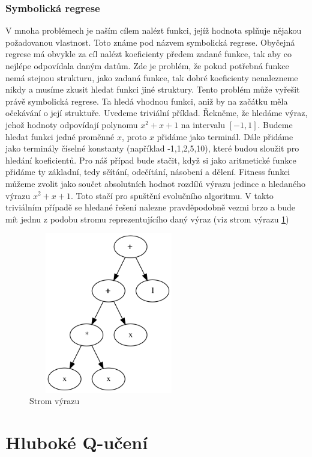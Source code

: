 \subsubsection{Symbolická regrese}
V mnoha problémech je naším cílem nalézt funkci, jejíž hodnota splňuje nějakou požadovanou vlastnost. Toto známe pod názvem symbolická regrese.
Obyčejná regrese má obvykle za cíl nalézt koeficienty předem zadané funkce, tak aby co nejlépe odpovídala daným datům.
Zde je problém, že pokud potřebná funkce nemá stejnou strukturu, jako zadaná funkce, tak dobré koeficienty nenalezneme nikdy a musíme zkusit hledat funkci jiné struktury.
Tento problém může vyřešit právě symbolická regrese. Ta hledá vhodnou funkci, aniž by na začátku měla očekávání o její struktuře.
Uvedeme triviální příklad. Řekněme, že hledáme výraz, jehož hodnoty odpovídají polynomu $x^2+x+1$ na intervalu $[-1,1]$.
Budeme hledat funkci jedné proměnné $x$, proto $x$ přidáme jako terminál. Dále přidáme jako terminály číselné konstanty (například -1,1,2,5,10), které budou sloužit pro hledání koeficientů.
Pro náš případ bude stačit, když si jako aritmetické funkce přidáme ty základní, tedy sčítání, odečítání, násobení a dělení.
Fitness funkci můžeme zvolit jako součet absolutních hodnot rozdílů výrazu jedince a hledaného výrazu $x^2+x+1$.
Toto stačí pro spuštění evolučního algoritmu. 
V takto triviálním případě se hledané řešení nalezne pravděpodobně vezmi brzo a bude mít jednu z podobu stromu reprezentujícího daný výraz (viz strom výrazu \ref{obr04:GrafFormule})


\begin{figure}[p]\centering
\includegraphics[width=70mm, height=70mm]{./Obrazky/formule_graph_2.png}
\caption{Strom výrazu}
\label{obr04:GrafFormule}
\end{figure}



\newpage
\section{Hluboké Q-učení}

